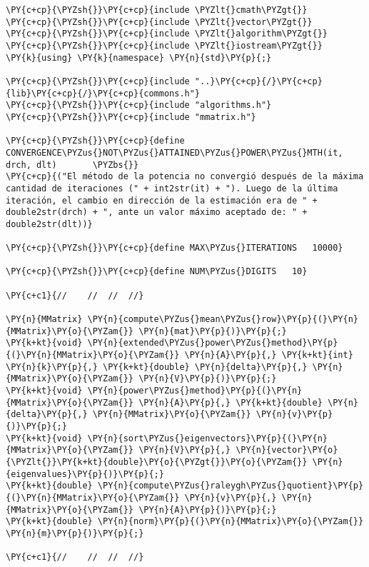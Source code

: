 \begin{Verbatim}[commandchars=\\\{\}]
\PY{c+cp}{\PYZsh{}}\PY{c+cp}{include \PYZlt{}cmath\PYZgt{}}
\PY{c+cp}{\PYZsh{}}\PY{c+cp}{include \PYZlt{}vector\PYZgt{}}
\PY{c+cp}{\PYZsh{}}\PY{c+cp}{include \PYZlt{}algorithm\PYZgt{}}
\PY{c+cp}{\PYZsh{}}\PY{c+cp}{include \PYZlt{}iostream\PYZgt{}}
\PY{k}{using} \PY{k}{namespace} \PY{n}{std}\PY{p}{;}

\PY{c+cp}{\PYZsh{}}\PY{c+cp}{include "..}\PY{c+cp}{/}\PY{c+cp}{lib}\PY{c+cp}{/}\PY{c+cp}{commons.h"}
\PY{c+cp}{\PYZsh{}}\PY{c+cp}{include "algorithms.h"}
\PY{c+cp}{\PYZsh{}}\PY{c+cp}{include "mmatrix.h"}

\PY{c+cp}{\PYZsh{}}\PY{c+cp}{define	CONVERGENCE\PYZus{}NOT\PYZus{}ATTAINED\PYZus{}POWER\PYZus{}MTH(it, drch, dlt)		\PYZbs{}}
\PY{c+cp}{("El método de la potencia no convergió después de la máxima cantidad de iteraciones (" + int2str(it) + "). Luego de la última iteración, el cambio en dirección de la estimación era de " + double2str(drch) + ", ante un valor máximo aceptado de: " + double2str(dlt))}

\PY{c+cp}{\PYZsh{}}\PY{c+cp}{define MAX\PYZus{}ITERATIONS	10000}

\PY{c+cp}{\PYZsh{}}\PY{c+cp}{define	NUM\PYZus{}DIGITS	10}

\PY{c+c1}{//	//	//	//}

\PY{n}{MMatrix} \PY{n}{compute\PYZus{}mean\PYZus{}row}\PY{p}{(}\PY{n}{MMatrix}\PY{o}{\PYZam{}} \PY{n}{mat}\PY{p}{)}\PY{p}{;}
\PY{k+kt}{void} \PY{n}{extended\PYZus{}power\PYZus{}method}\PY{p}{(}\PY{n}{MMatrix}\PY{o}{\PYZam{}} \PY{n}{A}\PY{p}{,} \PY{k+kt}{int} \PY{n}{k}\PY{p}{,} \PY{k+kt}{double} \PY{n}{delta}\PY{p}{,} \PY{n}{MMatrix}\PY{o}{\PYZam{}} \PY{n}{V}\PY{p}{)}\PY{p}{;}
\PY{k+kt}{void} \PY{n}{power\PYZus{}method}\PY{p}{(}\PY{n}{MMatrix}\PY{o}{\PYZam{}} \PY{n}{A}\PY{p}{,} \PY{k+kt}{double} \PY{n}{delta}\PY{p}{,} \PY{n}{MMatrix}\PY{o}{\PYZam{}} \PY{n}{v}\PY{p}{)}\PY{p}{;}
\PY{k+kt}{void} \PY{n}{sort\PYZus{}eigenvectors}\PY{p}{(}\PY{n}{MMatrix}\PY{o}{\PYZam{}} \PY{n}{V}\PY{p}{,} \PY{n}{vector}\PY{o}{\PYZlt{}}\PY{k+kt}{double}\PY{o}{\PYZgt{}}\PY{o}{\PYZam{}} \PY{n}{eigenvalues}\PY{p}{)}\PY{p}{;}
\PY{k+kt}{double} \PY{n}{compute\PYZus{}raleygh\PYZus{}quotient}\PY{p}{(}\PY{n}{MMatrix}\PY{o}{\PYZam{}} \PY{n}{v}\PY{p}{,} \PY{n}{MMatrix}\PY{o}{\PYZam{}} \PY{n}{A}\PY{p}{)}\PY{p}{;}
\PY{k+kt}{double} \PY{n}{norm}\PY{p}{(}\PY{n}{MMatrix}\PY{o}{\PYZam{}} \PY{n}{m}\PY{p}{)}\PY{p}{;}

\PY{c+c1}{//	//	//	//}


\end{Verbatim}
